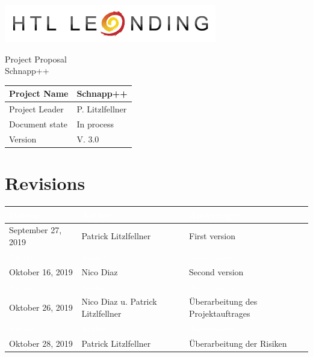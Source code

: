 \documentclass[12pt]{article}
\theoremstyle{definition}
\newcommand{\projectname}{Schnapp++}
\newcommand{\productname}{Schnapp++}
\newcommand{\projectleader}{P. Litzlfellner}
\newcommand{\documentstatus}{In process}
\newcommand{\version}{V. 3.0}
\begin{document}
\begin{titlepage}
\begin{flushright}
\includegraphics[scale=.5]{./media/htlleondinglogo.png}\\
\end{flushright}

\vspace{10em}

\begin{center}
{\Huge Project Proposal} \\[3em]
{\LARGE \productname} \\[3em]
\end{center}

\begin{flushleft}
\begin{tabular}{|l|l|}
\hline
Project Name & \projectname \\ \hline
Project Leader & \projectleader \\ \hline
Document state & \documentstatus \\ \hline
Version & \version \\ \hline
\end{tabular}
\end{flushleft}

\end{titlepage}
\section*{Revisions}
\begin{tabular}{|l|l|l|}
\hline
\cellcolor[gray]{0.5}\textcolor{white}{Datum} & \cellcolor[gray]{0.5}\textcolor{white}{Author} & \cellcolor[gray]{0.5}\textcolor{white}{Änderungen} \\ \hline
September 27, 2019&Patrick Litzlfellner &First version \\ \hline
\cellcolor[gray]{0.5}\textcolor{white}{Datum} & \cellcolor[gray]{0.5}\textcolor{white}{Author} & \cellcolor[gray]{0.5}\textcolor{white}{Änderungen} \\ \hline
Oktober 16, 2019&Nico Diaz &Second version \\ \hline
\cellcolor[gray]{0.5}\textcolor{white}{Datum} & \cellcolor[gray]{0.5}\textcolor{white}{Author} & \cellcolor[gray]{0.5}\textcolor{white}{Änderungen} \\ \hline
Oktober 26, 2019&Nico Diaz u. Patrick Litzlfellner &Überarbeitung des Projektauftrages \\ \hline
\cellcolor[gray]{0.5}\textcolor{white}{Datum} & \cellcolor[gray]{0.5}\textcolor{white}{Author} & \cellcolor[gray]{0.5}\textcolor{white}{Änderungen} \\ \hline
Oktober 28, 2019&Patrick Litzlfellner & Überarbeitung der Risiken \\ \hline
\end{tabular}
\pagebreak
\end{document}
